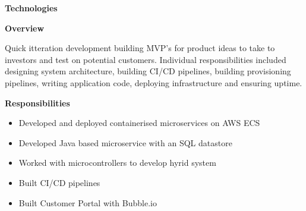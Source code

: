 \documentclass[10pt,a4paper]{altacv}
\begin{document}
\textbf{Technologies}

\divider

\textbf{Overview}

Quick itteration development building MVP's for product ideas to take to investors and test on potential customers. Individual responsibilities included designing system architecture, building CI/CD pipelines, building provisioning pipelines, writing application code, deploying infrastructure and ensuring uptime. 
\divider

\textbf{Responsibilities}
\begin{itemize}
  \item Developed and deployed containerised microservices on AWS ECS
  \item Developed Java based microservice with an SQL datastore
  \item Worked with microcontrollers to develop hyrid system
  \item Built CI/CD pipelines
  \item Built Customer Portal with Bubble.io
\end{itemize}
\end{document}
